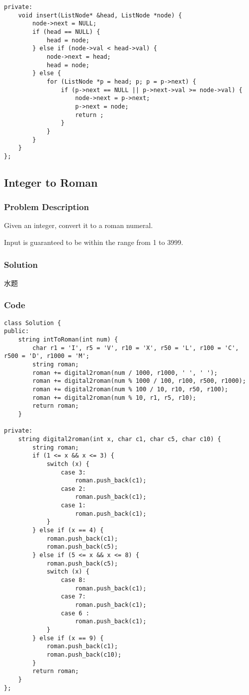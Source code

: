 \documentclass[courier]{article}
\begin{document}
\begin{CJK*}{UTF8}{gkai}
\begin{lstlisting}
private:
    void insert(ListNode* &head, ListNode *node) {
        node->next = NULL;
        if (head == NULL) {
            head = node;
        } else if (node->val < head->val) {
            node->next = head;
            head = node;
        } else {
            for (ListNode *p = head; p; p = p->next) {
                if (p->next == NULL || p->next->val >= node->val) {
                    node->next = p->next;
                    p->next = node;
                    return ;
                }
            }
        }
    }
}; 
\end{lstlisting}


\subsection{ Integer to Roman }

\subsubsection*{Problem Description}
Given an integer, convert it to a roman numeral.

Input is guaranteed to be within the range from 1 to 3999.



\subsubsection*{Solution}
水题

\subsubsection*{Code}
\begin{lstlisting}
class Solution {
public:
    string intToRoman(int num) {
        char r1 = 'I', r5 = 'V', r10 = 'X', r50 = 'L', r100 = 'C', r500 = 'D', r1000 = 'M';
        string roman;
        roman += digital2roman(num / 1000, r1000, ' ', ' ');
        roman += digital2roman(num % 1000 / 100, r100, r500, r1000);
        roman += digital2roman(num % 100 / 10, r10, r50, r100);
        roman += digital2roman(num % 10, r1, r5, r10);
        return roman;
    }
    
private:
    string digital2roman(int x, char c1, char c5, char c10) {
        string roman;
        if (1 <= x && x <= 3) {
            switch (x) {
                case 3:
                    roman.push_back(c1);
                case 2:
                    roman.push_back(c1);
                case 1:
                    roman.push_back(c1);
            }
        } else if (x == 4) {
            roman.push_back(c1);
            roman.push_back(c5);
        } else if (5 <= x && x <= 8) {
            roman.push_back(c5);
            switch (x) {
                case 8:
                    roman.push_back(c1);
                case 7:
                    roman.push_back(c1);
                case 6 :
                    roman.push_back(c1);
            }
        } else if (x == 9) {
            roman.push_back(c1);
            roman.push_back(c10);
        }
        return roman;
    }
}; 
\end{lstlisting}



\end{CJK*}
\end{document}
